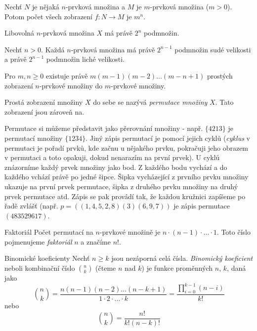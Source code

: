 \begin{veta}
Nechť $N$ je nějaká $n$-prvková množina a $M$ je $m$-prvková množina ($m > 0$). Potom počet všech zobrazení $f: N \rightarrow M$ je $m^n$.
\end{veta}

\begin{veta}
Libovolná $n$-prvková množina $X$ má právě $2^n$ podmnožin.
\end{veta}

\begin{veta}
Nechť $n>0$. Každá $n$-prvková množina má právě $2^{n-1}$ podmnožin sudé velikosti a právě $2^{n-1}$ podmnožin liché velikosti.
\end{veta}

\begin{veta}
Pro $m,n \ge 0$ existuje právě $m(m-1)(m-2) \dots (m-n+1)$ prostých zobrazení $n$-prvkové množiny do $m$-prvkové množiny.
\end{veta}

\begin{definice}
Prostá zobrazení množiny $X$ do sebe se nazývá \emph{permutace množiny} $X$. Tato zobrazení jsou zároveň na.

Permutace si můžeme představit jako přerovnání množiny - např. $\{4 2 1 3\}$ je permutací množiny $\{1 2 3 4\}$. Jiný zápis permutací je pomocí jejich cyklů (\emph{cyklus} v permutaci je pořadí prvků, kde začnu u nějakého prvku, pokračuji jeho obrazem v permutaci a toto opakuji, dokud nenarazím na první prvek). U cyklů znázorníme každý prvek množiny jako bod. Z každého bodu vychází a do každého vchází právě po jedné šipce. Šipka vycházející z prvního prvku množiny ukazuje na první prvek permutace, šipka z druhého prvku množiny na druhý prvek permutace atd. Zápis se pak provádí tak, že každou kružnici zapíšeme po řadě zvlášť (např. $p=((1,4,5,2,8)(3)(6,9,7))$ je zápis permutace $(4 8 3 5 2 9 6 1 7)$.
\end{definice}

\begin{vetaN}{Faktoriál}
Počet permutací na $n$-prvkové množině je $n\cdot(n-1)\cdot\dots\cdot 1$. Toto číslo pojmenujeme \emph{faktoriál} $n$ a značíme $n!$.
\end{vetaN}

\begin{definiceN}{Binomické koeficienty}
Nechť $n \ge k$ jsou nezáporná celá čísla. \emph{Binomický koeficient} neboli kombinační číslo $\binom{n}{k}$ (čteme $n$ nad $k$) je funkce proměnných $n$, $k$, daná jako $$\binom{n}{k}=\frac{n(n-1)(n-2)\dots(n-k+1)}{1 \cdot 2 \cdot \dots \cdot k}=\frac{\prod^{k-1}_{i=0} (n-i)}{k!}$$ nebo $$\binom{n}{k}=\frac{n!}{k!(n-k)!}$$
\end{definiceN}

